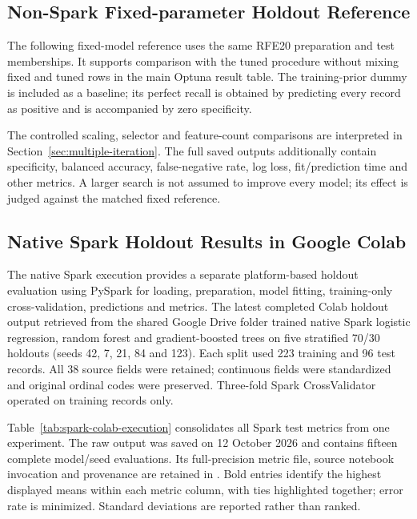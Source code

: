 \subsection{Non-Spark Fixed-parameter Holdout Reference}
The following fixed-model reference uses the same RFE20 preparation and test memberships. It supports comparison with the tuned procedure without mixing fixed and tuned rows in the main Optuna result table. The training-prior dummy is included as a baseline; its perfect recall is obtained by predicting every record as positive and is accompanied by zero specificity.



The controlled scaling, selector and feature-count comparisons are interpreted in Section~\ref{sec:multiple-iteration}. The full saved outputs additionally contain specificity, balanced accuracy, false-negative rate, log loss, fit/prediction time and other metrics. A larger search is not assumed to improve every model; its effect is judged against the matched fixed reference.

\subsection{Native Spark Holdout Results in Google Colab}
The native Spark execution provides a separate platform-based holdout evaluation using PySpark for loading, preparation, model fitting, training-only cross-validation, predictions and metrics. The latest completed Colab holdout output retrieved from the shared Google Drive folder trained native Spark logistic regression, random forest and gradient-boosted trees on five stratified 70/30 holdouts (seeds 42, 7, 21, 84 and 123). Each split used 223 training and 96 test records. All 38 source fields were retained; continuous fields were standardized and original ordinal codes were preserved. Three-fold Spark CrossValidator operated on training records only.



Table~\ref{tab:spark-colab-execution} consolidates all Spark test metrics from one experiment. The raw output was saved on 12 October 2026 and contains fifteen complete model/seed evaluations. Its full-precision metric file, source notebook invocation and provenance are retained in . Bold entries identify the highest displayed means within each metric column, with ties highlighted together; error rate is minimized. Standard deviations are reported rather than ranked.

